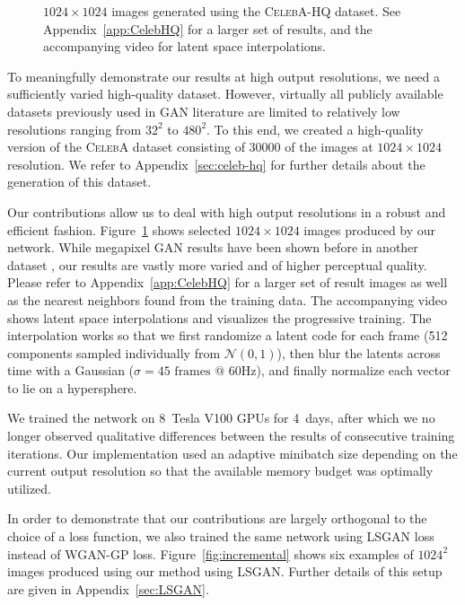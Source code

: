 \begin{figure}
\centering

\caption{$1024\times1024$ images generated using the \textsc{CelebA-HQ} dataset. See Appendix~\ref{app:CelebHQ} for a larger set of results, and the accompanying video for latent space interpolations. }
\label{fig:celebHQResults}
\end{figure}

To meaningfully demonstrate our results at high output resolutions, we need a sufficiently varied high-quality dataset. However, virtually all publicly available datasets previously used in GAN literature are limited to relatively low resolutions ranging from $32^2$ to $480^2$. To this end, we created a high-quality version of the \textsc{CelebA} dataset consisting of 30000 of the images at $1024\times1024$ resolution. We refer to Appendix~\ref{sec:celeb-hq} for further details about the generation of this dataset.

Our contributions allow us to deal with high output resolutions in a robust and efficient fashion.
Figure~\ref{fig:celebHQResults} shows selected $1024\times1024$ images produced by our network. While megapixel GAN results have been shown before in another dataset \citep{Marchesi2017}, our results are vastly more varied and of higher perceptual quality. Please refer to Appendix~\ref{app:CelebHQ} for a larger set of result images as well as the nearest neighbors found from the training data. The accompanying video shows latent space interpolations and visualizes the progressive training. The interpolation works so that we first randomize a latent code for each frame (512 components sampled individually from $\mathcal{N}(0,1)$), then blur the latents across time with a Gaussian ($\sigma=45\text{ frames @ 60Hz}$), and finally normalize each vector to lie on a hypersphere.

We trained the network on 8~Tesla V100 GPUs for 4~days, after which we no longer observed qualitative differences between the results of consecutive training iterations. Our implementation used an adaptive minibatch size depending on the current output resolution so that the available memory budget was optimally utilized. 

In order to demonstrate that our contributions are largely orthogonal to the choice of a loss function, we also trained the same network using LSGAN loss instead of WGAN-GP loss. Figure~\ref{fig:incremental} shows six examples of $1024^2$ images produced using our method using LSGAN. Further details of this setup are given in Appendix~\ref{sec:LSGAN}.

